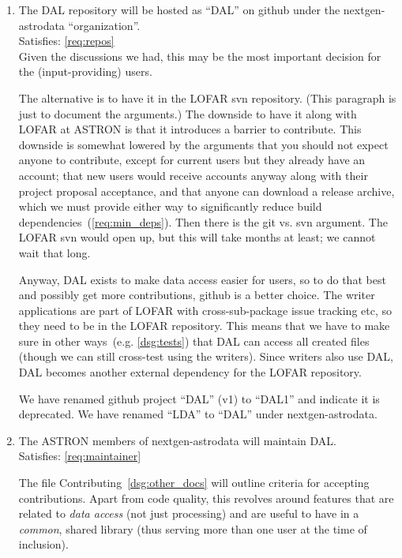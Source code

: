 \documentclass[a4paper,11pt]{article}
\begin{document}
\begin{enumerate}[resume, label=\it D.\arabic{*}]
\itemsep0em

\item \label{dsg:repos} The DAL repository will be hosted as ``DAL'' on github under the nextgen-astrodata ``organization''.\\
Satisfies: \ref{req:repos}\\
Given the discussions we had, this may be the most important decision for the (input-providing) users.

The alternative is to have it in the LOFAR svn repository.
(This paragraph is just to document the arguments.)
The downside to have it along with LOFAR at ASTRON is that it introduces a barrier to contribute.
This downside is somewhat lowered by the arguments that you should not expect anyone to contribute, except for current users but they already have an account; that new users would receive accounts anyway along with their project proposal acceptance, and that anyone can download a release archive, which we must provide either way to significantly reduce build dependencies~(\ref{req:min_deps}).
Then there is the git vs. svn argument.
The LOFAR svn would open up, but this will take months at least; we cannot wait that long.

Anyway, DAL exists to make data access easier for users, so to do that best and possibly get more contributions, github is a better choice.
The writer applications are part of LOFAR with cross-sub-package issue tracking etc, so they need to be in the LOFAR repository.
This means that we have to make sure in other ways~(e.g. \ref{dsg:tests}) that DAL can access all created files (though we can still cross-test using the writers).
Since writers also use DAL, DAL becomes another external dependency for the LOFAR repository.

We have renamed github project ``DAL'' (v1) to ``DAL1'' and indicate it is deprecated.
We have renamed ``LDA'' to ``DAL'' under nextgen-astrodata.

\item \label{dsg:maintainer} The ASTRON members of nextgen-astrodata will maintain DAL.\\
Satisfies: \ref{req:maintainer}

The file Contributing~\ref{dsg:other_docs} will outline criteria for accepting contributions.
Apart from code quality, this revolves around features that are related to \emph{data access} (not just processing) and are useful to have in a \emph{common}, shared library (thus serving more than one user at the time of inclusion).


\end{enumerate}
\end{document}
